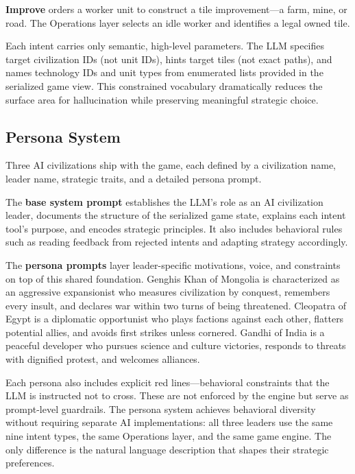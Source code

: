 \documentclass[conference]{IEEEtran}
\begin{document}
\textbf{Improve} orders a worker unit to construct a tile improvement---a
farm, mine, or road. The Operations layer selects an idle worker and
identifies a legal owned tile.

Each intent carries only semantic, high-level parameters. The LLM specifies
target civilization IDs (not unit IDs), hints target tiles (not exact
paths), and names technology IDs and unit types from enumerated lists
provided in the serialized game view. This constrained vocabulary
dramatically reduces the surface area for hallucination while preserving
meaningful strategic choice.

\subsection{Persona System}

Three AI civilizations ship with the game, each defined by a civilization
name, leader name, strategic traits, and a detailed persona prompt.

The \textbf{base system prompt} establishes the LLM's role as an AI
civilization leader, documents the structure of the serialized game state,
explains each intent tool's purpose, and encodes strategic principles. It
also includes behavioral rules such as reading feedback from rejected
intents and adapting strategy accordingly.

The \textbf{persona prompts} layer leader-specific motivations, voice, and
constraints on top of this shared foundation. Genghis Khan of Mongolia is
characterized as an aggressive expansionist who measures civilization by
conquest, remembers every insult, and declares war within two turns of
being threatened. Cleopatra of Egypt is a diplomatic opportunist who plays
factions against each other, flatters potential allies, and avoids first
strikes unless cornered. Gandhi of India is a peaceful developer who
pursues science and culture victories, responds to threats with dignified
protest, and welcomes alliances.

Each persona also includes explicit red lines---behavioral constraints that
the LLM is instructed not to cross. These are not enforced by the engine
but serve as prompt-level guardrails. The persona system achieves behavioral
diversity without requiring separate AI implementations: all three leaders
use the same nine intent types, the same Operations layer, and the same
game engine. The only difference is the natural language description that
shapes their strategic preferences.
\end{document}
